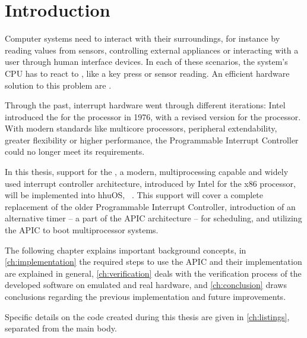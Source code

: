 \chapter{Introduction}
\label{ch:introduction}

\clearpage

Computer systems need to interact with their surroundings, for instance by reading values from sensors, controlling external appliances or interacting with a user through human interface devices.
In each of these scenarios, the system's CPU has to react to , like a key press or sensor reading.
An efficient hardware solution to this problem are .

Through the past, interrupt hardware went through different iterations: Intel introduced the  for the  processor in 1976, with a revised version for the  processor.
With modern standards like multicore processors, peripheral extendability, greater flexibility or higher performance, the Programmable Interrupt Controller could no longer meet its requirements.

In this thesis, support for the , a modern, multiprocessing capable and widely used interrupt controller architecture, introduced by Intel for the x86  processor, will be implemented into hhuOS, ~\autocite{hhuos}.
This support will cover a complete replacement of the older Programmable Interrupt Controller, introduction of an alternative timer -- a part of the APIC architecture -- for scheduling, and utilizing the APIC to boot multiprocessor systems.

The following chapter explains important background concepts, in \autoref{ch:implementation} the required steps to use the APIC and their implementation are explained in general, \autoref{ch:verification} deals with the verification process of the developed software on emulated and real hardware, and \autoref{ch:conclusion} draws conclusions regarding the previous implementation and future improvements.

Specific details on the code created during this thesis are given in \autoref{ch:listings}, separated from the main body.

\cleardoublepage